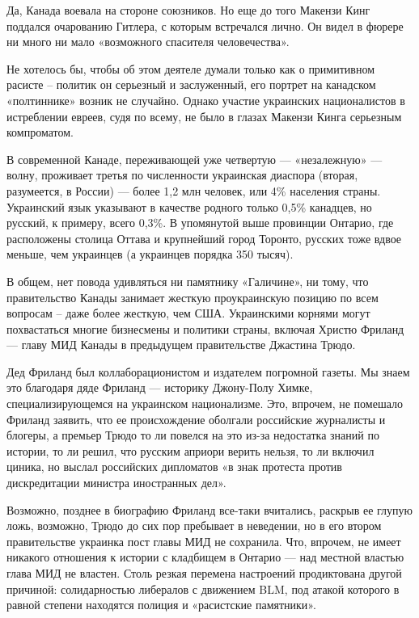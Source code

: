 Да, Канада воевала на стороне союзников. Но еще до того Макензи Кинг поддался
очарованию Гитлера, с которым встречался лично. Он видел в фюрере ни много ни
мало «возможного спасителя человечества».

Не хотелось бы, чтобы об этом деятеле думали только как о примитивном расисте –
политик он серьезный и заслуженный, его портрет на канадском «полтиннике»
возник не случайно. Однако участие украинских националистов в истреблении
евреев, судя по всему, не было в глазах Макензи Кинга серьезным компроматом.

В современной Канаде, переживающей уже четвертую --- «незалежную» --- волну,
проживает третья по численности украинская диаспора (вторая, разумеется, в
России) --- более 1,2 млн человек, или 4\% населения страны. Украинский язык
указывают в качестве родного только 0,5\% канадцев, но русский, к примеру, всего
0,3\%. В упомянутой выше провинции Онтарио, где расположены столица Оттава и
крупнейший город Торонто, русских тоже вдвое меньше, чем украинцев (а украинцев
порядка 350 тысяч).

В общем, нет повода удивляться ни памятнику «Галичине», ни тому, что
правительство Канады занимает жесткую проукраинскую позицию по всем вопросам –
даже более жесткую, чем США. Украинскими корнями могут похвастаться многие
бизнесмены и политики страны, включая Христю Фриланд --- главу МИД Канады в
предыдущем правительстве Джастина Трюдо.

Дед Фриланд был коллаборационистом и издателем погромной газеты. Мы знаем это
благодаря дяде Фриланд --- историку Джону-Полу Химке, специализирующемся на
украинском национализме. Это, впрочем, не помешало Фриланд заявить, что ее
происхождение оболгали российские журналисты и блогеры, а премьер Трюдо то ли
повелся на это из-за недостатка знаний по истории, то ли решил, что русским
априори верить нельзя, то ли включил циника, но выслал российских дипломатов «в
знак протеста против дискредитации министра иностранных дел».

Возможно, позднее в биографию Фриланд все-таки вчитались, раскрыв ее глупую
ложь, возможно, Трюдо до сих пор пребывает в неведении, но в его втором
правительстве украинка пост главы МИД не сохранила. Что, впрочем, не имеет
никакого отношения к истории с кладбищем в Онтарио --- над местной властью глава
МИД не властен. Столь резкая перемена настроений продиктована другой причиной:
солидарностью либералов с движением BLM, под атакой которого в равной степени
находятся полиция и «расистские памятники».

